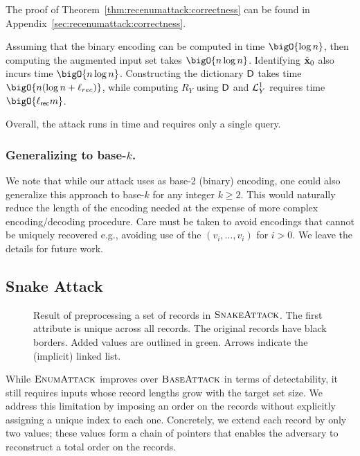 The proof of Theorem~\ref{thm:recenumattack:correctness} can be found in
Appendix~\ref{sec:recenumattack:correctness}.

  Assuming that the binary encoding can be
computed in time $\bigO{\log n}$, then computing the augmented input set takes
$\bigO{n \log n}$.  Identifying $\hat{\mathbf{x}}_0$ also incurs time $\bigO{n \log
  n}$. Constructing the dictionary $\mathsf{D}$ takes time
$\bigO{n(\log n + \ell_{rec})}$, while computing $R_Y$ using $\mathsf{D}$ and
$\mathcal{L}^{1}_Y$ requires time $\bigO{\ell_{\rec} m}$.

Overall, the attack runs in time  and requires only a single query.

\subsubsection{Generalizing to base-$k$.} We note that while our attack uses as
base-2 (binary) encoding, one could also generalize this approach to base-$k$
for any integer $k\geq 2$. This would naturally reduce the length of the
encoding needed at the expense of more complex encoding/decoding procedure. Care
must be taken to avoid encodings that cannot be uniquely recovered e.g.,
avoiding use of the $(v_i,\dots, v_i)$ for $i>0$. We leave the details for
future work.

\subsection{Snake Attack}\label{sec:snake_attack}

\begin{figure}
	\centering
	{\def\rowspace{.4cm}
	\def\minwidthemail{2cm}
	\def\minwidthphone{2.1cm}
	\def\minwidthid{.6cm}
	\def\linecorr{-.4pt}
	\def\blockminheight{1.3em}
        \resizebox{0.75\columnwidth}{!}{%
        
        }
    }
	\caption{Result of preprocessing a set of records in $\textsc{SnakeAttack}$. The first attribute is unique across all records.
	The original records have black borders. Added values are outlined in green. Arrows indicate the (implicit) linked list.}\label{fig:snake_exmp}
\end{figure}


While $\textsc{EnumAttack}$ improves over $\textsc{BaseAttack}$ in terms of
detectability, it still requires inputs whose record lengths grow with the
target set size. We address this limitation by imposing an order on the records
without explicitly assigning a unique index to each one. Concretely, we extend
each record by only two values; these values form a chain of pointers that
enables the adversary to reconstruct a total order on the records.

